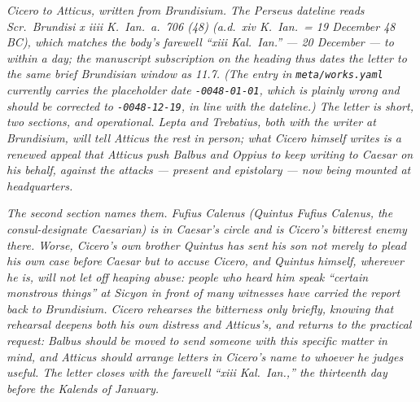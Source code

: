 
\textit{Cicero to Atticus, written from Brundisium. The
Perseus dateline reads \textit{Scr.\ Brundisi x iiii K.\
Ian.\ a.\ 706 (48)} (a.d.\ xiv K.\ Ian.\ = 19 December
48 BC), which matches the body's farewell ``xiii Kal.\
Ian.'' --- 20 December --- to within a day; the
manuscript subscription on the heading thus dates the
letter to the same brief Brundisian window as 11.7.
(The entry in \texttt{meta/works.yaml} currently carries
the placeholder date \texttt{-0048-01-01}, which is
plainly wrong and should be corrected to
\texttt{-0048-12-19}, in line with the dateline.)
The letter is short, two sections, and operational.
Lepta and Trebatius, both with the writer at
Brundisium, will tell Atticus the rest in person;
what Cicero himself writes is a renewed appeal that
Atticus push Balbus and Oppius to keep writing to
Caesar on his behalf, against the attacks --- present
and epistolary --- now being mounted at headquarters.}

\textit{The second section names them. Fufius Calenus
(Quintus Fufius Calenus, the consul-designate Caesarian)
is in Caesar's circle and is Cicero's bitterest enemy
there. Worse, Cicero's own brother Quintus has sent
his son not merely to plead his own case before Caesar
but to accuse Cicero, and Quintus himself, wherever
he is, will not let off heaping abuse: people who heard
him speak ``certain monstrous things'' at Sicyon in
front of many witnesses have carried the report back
to Brundisium. Cicero rehearses the bitterness only
briefly, knowing that rehearsal deepens both his own
distress and Atticus's, and returns to the practical
request: Balbus should be moved to send someone with
this specific matter in mind, and Atticus should
arrange letters in Cicero's name to whoever he judges
useful. The letter closes with the farewell ``xiii
Kal.\ Ian.,'' the thirteenth day before the Kalends
of January.}
